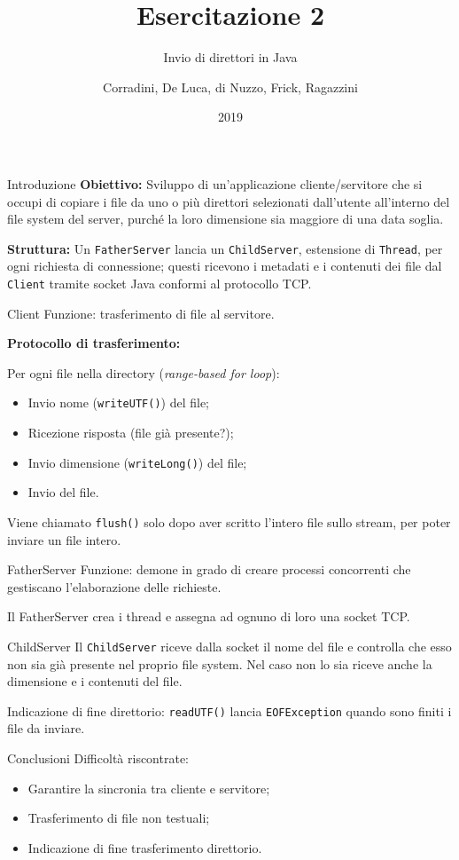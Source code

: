\documentclass{beamer}
\begin{document}
\title{Esercitazione 2}
\subtitle{Invio di direttori in Java}
\author{Corradini, De Luca, di Nuzzo, Frick, Ragazzini}
\date{2019}
\begin{frame}
\titlepage
\end{frame}
\begin{frame}[fragile]{Introduzione}
\textbf{Obiettivo:} Sviluppo di un'applicazione cliente/servitore che si occupi di copiare i file da uno o più direttori selezionati dall'utente all'interno del file system del server, purché la loro dimensione sia maggiore di una data soglia.

\textbf{Struttura:} Un \texttt{FatherServer} lancia un \texttt{ChildServer}, estensione di \texttt{Thread}, per ogni richiesta di connessione; questi ricevono i metadati e i contenuti dei file dal \texttt{Client} tramite socket Java conformi al protocollo TCP.
\end{frame}
\begin{frame}[fragile]{Client}
Funzione: trasferimento di file al servitore.

\textbf{Protocollo di trasferimento:}

Per ogni file nella directory (\textit{range-based for loop}):
\begin{itemize} 
\item Invio nome (\texttt{writeUTF()}) del file;
\item Ricezione risposta (file già presente?);
\item Invio dimensione (\texttt{writeLong()}) del file;
\item Invio del file.
\end{itemize}
Viene chiamato \texttt{flush()} solo dopo aver scritto l'intero file sullo stream, per poter inviare un file intero.
\end{frame}

\begin{frame}[fragile]{FatherServer}
Funzione: demone in grado di creare processi concorrenti che gestiscano l'elaborazione delle richieste.

Il FatherServer crea i thread e assegna ad ognuno di loro una socket TCP. 
\end{frame}

\begin{frame}[fragile]{ChildServer}
Il \texttt{ChildServer} riceve dalla socket il nome del file e controlla che esso non sia già presente nel proprio file system. Nel caso non lo sia riceve anche la dimensione e i contenuti del file.

Indicazione di fine direttorio: \texttt{readUTF()} lancia \texttt{EOFException} quando sono finiti i file da inviare.
\end{frame}

\begin{frame}{Conclusioni}
Difficoltà riscontrate:
\begin{itemize}
\item Garantire la sincronia tra cliente e servitore;
\item Trasferimento di file non testuali;
\item Indicazione di fine trasferimento direttorio.
\end{itemize}
\end{frame}
\end{document}
